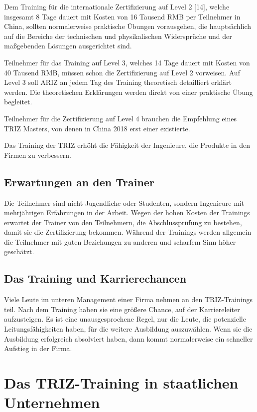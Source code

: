 \documentclass[11pt,a4paper]{article}
\begin{document}
Dem Training für die internationale Zertifizierung auf Level 2 [14], welche
insgesamt 8 Tage dauert mit Kosten von 16 Tausend RMB per Teilnehmer in China,
sollten normalerweise praktische Übungen vorausgehen, die hauptsächlich auf
die Bereiche der technischen und physikalischen Widersprüche und der
maßgebenden Lösungen ausgerichtet sind.

Teilnehmer für das Training auf Level 3, welches 14 Tage dauert mit Kosten von
40 Tausend RMB, müssen schon die Zertifizierung auf Level 2 vorweisen. Auf
Level 3 soll ARIZ an jedem Tag des Training theoretisch detailliert erklärt
werden. Die theoretischen Erklärungen werden direkt von einer praktische Übung
begleitet.

Teilnehmer für die Zertifizierung auf Level 4 brauchen die Empfehlung eines
TRIZ Masters, von denen in China 2018 erst einer existierte.

Das Training der TRIZ erhöht die Fähigkeit der Ingenieure, die Produkte in den
Firmen zu verbessern.
  
\subsection{Erwartungen an den Trainer}

Die Teilnehmer sind nicht Jugendliche oder Studenten, sondern Ingenieure mit
mehrjährigen Erfahrungen in der Arbeit. Wegen der hohen Kosten der Trainings
erwartet der Trainer von den Teilnehmern, die Abschlussprüfung zu bestehen,
damit sie die Zertifizierung bekommen.  Während der Trainings werden allgemein
die Teilnehmer mit guten Beziehungen zu anderen und scharfem Sinn höher
geschätzt.

\subsection{Das Training und Karrierechancen}

Viele Leute im unteren Management einer Firma nehmen an den TRIZ-Trainings
teil.  Nach dem Training haben sie eine größere Chance, auf der Karriereleiter
aufzusteigen. Es ist eine unausgesprochene Regel, nur die Leute, die
potenzielle Leitungsfähigkeiten haben, für die weitere Ausbildung auszuwählen.
Wenn sie die Ausbildung erfolgreich absolviert haben, dann kommt normalerweise
ein schneller Aufstieg in der Firma.

\section{Das TRIZ-Training in staatlichen Unternehmen}
\end{document}
